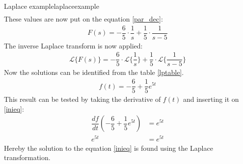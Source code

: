 \begin{example}{Laplace example}{laplaceexample}
\begin{align*}
\end{align*}
These values are now put on the equation \ref{par_dec}:
\begin{align*}
F(s) =  - \dfrac{6}{5} \cdot \dfrac{1}{s} + \dfrac{1}{5} \cdot \dfrac{1}{s-5}
\end{align*}
The inverse Laplace transform is now applied:
\begin{align*}
\mathcal{L} \{F(s)\} =  - \dfrac{6}{5} \cdot \mathcal{L} \{\dfrac{1}{s}\} + \dfrac{1}{5} \cdot \mathcal{L} \{\dfrac{1}{s-5}\}
\end{align*}
Now the solutions can be identified from the table \ref{lptable}.
\begin{align*}
f(t) = - \dfrac{6}{5} + \dfrac{1}{5}e^{5t}
\end{align*}
This result can be tested by taking the derivative of $f(t)$ and inserting it on \ref{inieq}:
\begin{align*}
\dfrac{df}{dt} \left(- \dfrac{6}{5} + \dfrac{1}{5}e^{5t} \right) &= e^{5t} \\
e^{5t} &= e^{5t}
\end{align*}
Hereby the solution to the equation \ref{inieq} is found using the Laplace transformation.
\end{example}